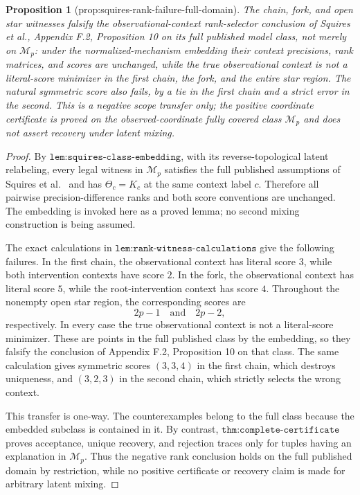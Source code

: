 \documentclass{article}
\newtheorem{proposition}{Proposition}
\begin{document}
\begin{proposition}[prop:squires-rank-failure-full-domain]\label{prop:squires-rank-failure-full-domain}
The chain, fork, and open star witnesses falsify the observational-context rank-selector conclusion of Squires et al., Appendix F.2, Proposition 10 on its full published model class, not merely on \(\mathcal M_p\): under the normalized-mechanism embedding their context precisions, rank matrices, and scores are unchanged, while the true observational context is not a literal-score minimizer in the first chain, the fork, and the entire star region.  The natural symmetric score also fails, by a tie in the first chain and a strict error in the second.  This is a negative scope transfer only; the positive coordinate certificate is proved on the observed-coordinate fully covered class \(\mathcal M_p\) and does not assert recovery under latent mixing.
\end{proposition}
\begin{proof}
By \(\texttt{lem:squires-class-embedding}\), with its reverse-topological
latent relabeling, every legal witness in \(\mathcal M_p\) satisfies the
full published assumptions of Squires
et al.~\cite[Assumption 1 and Appendix F.2, Proposition 10]{pmlr-v202-squires23a}
and has
\(\Theta_c=K_c\) at the same context label \(c\).  Therefore all
pairwise precision-difference ranks and both score conventions are
unchanged.  The embedding is invoked here as a proved lemma; no second
mixing construction is being assumed.

The exact calculations in \(\texttt{lem:rank-witness-calculations}\)
give the following failures.  In the first chain, the observational
context has literal score \(3\), while both intervention contexts have
score \(2\).  In the fork, the observational context has literal score
\(5\), while the root-intervention context has score \(4\).  Throughout
the nonempty open star region, the corresponding scores are
\[
 2p-1\quad\text{and}\quad 2p-2,
\]
respectively.  In every case the true observational context is not a
literal-score minimizer.  These are points in the full published class by
the embedding, so they falsify the conclusion of Appendix F.2,
Proposition 10 on that class.  The same calculation gives symmetric scores
\((3,3,4)\) in the first chain, which destroys uniqueness, and
\((3,2,3)\) in the second chain, which strictly selects the wrong
context.

This transfer is one-way.  The counterexamples belong to the full class
because the embedded subclass is contained in it.  By contrast,
\(\texttt{thm:complete-certificate}\) proves acceptance, unique recovery,
and rejection traces only for tuples having an explanation in
\(\mathcal M_p\).  Thus the negative rank conclusion holds on the full
published domain by restriction, while no positive certificate or
recovery claim is made for arbitrary latent mixing.
\end{proof}
\end{document}
